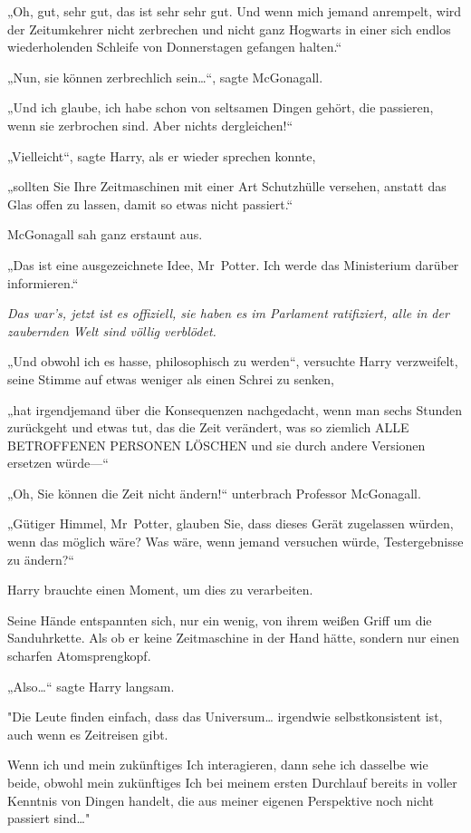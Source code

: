 {„Oh, gut, sehr gut, das ist sehr sehr gut. Und wenn mich jemand anrempelt, wird der Zeitumkehrer nicht zerbrechen und nicht ganz Hogwarts in einer sich endlos wiederholenden Schleife von Donnerstagen gefangen halten.“

„Nun, sie können zerbrechlich sein…“, sagte McGonagall.

„Und ich glaube, ich habe schon von seltsamen Dingen gehört, die passieren, wenn sie zerbrochen sind. Aber nichts dergleichen!“

„Vielleicht“, sagte Harry, als er wieder sprechen konnte,

„sollten Sie Ihre Zeitmaschinen mit einer Art Schutzhülle versehen, anstatt das Glas offen zu lassen, damit so etwas nicht passiert.“

McGonagall sah ganz erstaunt aus.

„Das ist eine ausgezeichnete Idee, Mr~Potter. Ich werde das Ministerium darüber informieren.“

\emph{Das war's, jetzt ist es offiziell, sie haben es im Parlament ratifiziert, alle in der zaubernden Welt sind völlig verblödet.}

„Und obwohl ich es hasse, philosophisch zu werden“, versuchte Harry verzweifelt, seine Stimme auf etwas weniger als einen Schrei zu senken,

„hat irgendjemand über die Konsequenzen nachgedacht, wenn man sechs Stunden zurückgeht und etwas tut, das die Zeit verändert, was so ziemlich ALLE BETROFFENEN PERSONEN LÖSCHEN und sie durch andere Versionen ersetzen würde—“

„Oh, Sie können die Zeit nicht ändern!“ unterbrach Professor McGonagall.

„Gütiger Himmel, Mr~Potter, glauben Sie, dass dieses Gerät zugelassen würden, wenn das möglich wäre? Was wäre, wenn jemand versuchen würde, Testergebnisse zu ändern?“

Harry brauchte einen Moment, um dies zu verarbeiten.

Seine Hände entspannten sich, nur ein wenig, von ihrem weißen Griff um die Sanduhrkette. Als ob er keine Zeitmaschine in der Hand hätte, sondern nur einen scharfen Atomsprengkopf.

„Also…“ sagte Harry langsam.

"Die Leute finden einfach, dass das Universum… irgendwie selbstkonsistent ist, auch wenn es Zeitreisen gibt.

Wenn ich und mein zukünftiges Ich interagieren, dann sehe ich dasselbe wie beide, obwohl mein zukünftiges Ich bei meinem ersten Durchlauf bereits in voller Kenntnis von Dingen handelt, die aus meiner eigenen Perspektive noch nicht passiert sind…"

}
